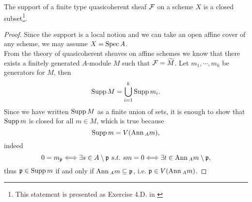 \begin{lemma}\label{CriterionForClosedSupport}
The support of a finite type quasicoherent sheaf $\mathcal{F}$ on a scheme $X$ is a
closed subset\footnote{This statement is presented as Exercise 4.D. in \cite{VakilClass26}}.
\end{lemma}
\begin{proof}
Since the support is a local notion and we can take an open affine cover of any scheme, we may assume $X=\mathrm{Spec}\, A$.\\
From the theory of quasicoherent sheaves on affine schemes we know that there exists a finitely generated $A$-module $M$ such that $\mathcal{F}=\widetilde{M}$. Let $m_1,\cdots, m_k$ be generators for $M$, then 
\[\mathrm{Supp}\, M=\bigcup_{i=1}^k\mathrm{Supp}\, m_{i}.\]
Since we have written $\mathrm{Supp}\, M$ as a finite union of sets, it is enough to show that $\mathrm{Supp}\, m$ is closed for all $m\in M$, which is true because
\[\mathrm{Supp}\, m=V(\mathrm{Ann}\,_A m),\]
indeed
\[0=m_{\mathfrak{p}}\Longleftrightarrow \exists s\in A\setminus \mathfrak{p}\ s.t.\ sm=0\Longleftrightarrow \exists t\in \mathrm{Ann}\,_A m\setminus \mathfrak{p},\]
thus $\mathfrak{p}\in \mathrm{Supp}\, m$ if and only if $\mathrm{Ann}\,_A m\subseteq \mathfrak{p}$, i.e. $\mathfrak{p}\in V(\mathrm{Ann}\,_Am)$.
\end{proof}



